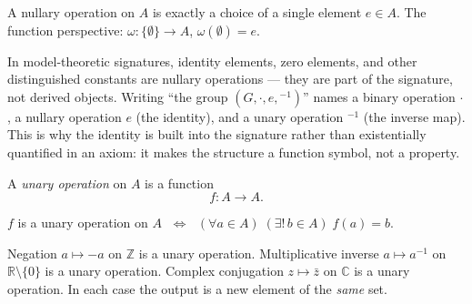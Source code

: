 \begin{remark}
A nullary operation on $A$ is exactly a choice of a single element
$e \in A$.
The function perspective: $\omega : \{\emptyset\} \to A$,
$\omega(\emptyset) = e$.
\end{remark}

\begin{remark}
In model-theoretic signatures, identity elements, zero elements, and
other distinguished constants are nullary operations — they are part of the
signature, not derived objects.
Writing ``the group $(G, \cdot, e, {}^{-1})$'' names a binary operation
$\cdot$, a nullary operation $e$ (the identity), and a unary operation
${}^{-1}$ (the inverse map).
This is why the identity is built into the signature rather than
existentially quantified in an axiom: it makes the structure a function
symbol, not a property.
\end{remark}


\begin{tcolorbox}[colback=propbox, colframe=propborder, arc=2pt,
  left=6pt, right=6pt, top=4pt, bottom=4pt,
  title={\small\textbf{Definition (Unary Operation)}},
  fonttitle=\small\bfseries]
\label{def:unary-op}
A \emph{unary operation} on $A$ is a function
\[
  f : A \to A.
\]
\end{tcolorbox}

\begin{remark}
$f$ is a unary operation on $A$
$\;\iff\;$
$(\forall a \in A)\;(\exists!\, b \in A)\; f(a) = b$.
\end{remark}

\begin{remark}[Examples]
Negation $a \mapsto -a$ on $\mathbb{Z}$ is a unary operation.
Multiplicative inverse $a \mapsto a^{-1}$ on $\mathbb{R} \setminus \{0\}$
is a unary operation.
Complex conjugation $z \mapsto \bar{z}$ on $\mathbb{C}$ is a unary operation.
In each case the output is a new element of the \emph{same} set.
\end{remark}

